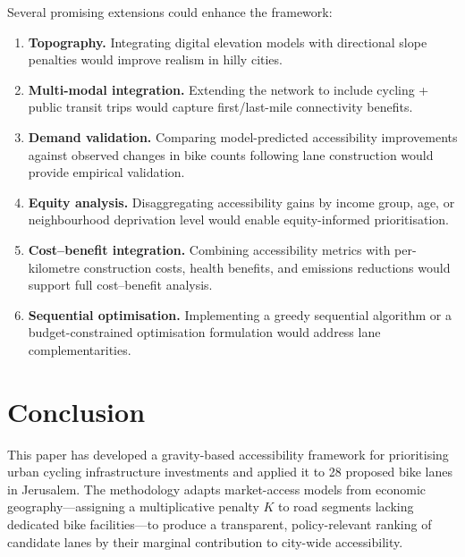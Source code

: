 \documentclass[12pt,a4paper]{article}
\begin{document}
Several promising extensions could enhance the framework:

\begin{enumerate}[leftmargin=*]
    \item \textbf{Topography.} Integrating digital elevation models with directional slope penalties would improve realism in hilly cities.
    \item \textbf{Multi-modal integration.} Extending the network to include cycling + public transit trips would capture first/last-mile connectivity benefits.
    \item \textbf{Demand validation.} Comparing model-predicted accessibility improvements against observed changes in bike counts following lane construction would provide empirical validation.
    \item \textbf{Equity analysis.} Disaggregating accessibility gains by income group, age, or neighbourhood deprivation level would enable equity-informed prioritisation.
    \item \textbf{Cost--benefit integration.} Combining accessibility metrics with per-kilometre construction costs, health benefits, and emissions reductions would support full cost--benefit analysis.
    \item \textbf{Sequential optimisation.} Implementing a greedy sequential algorithm or a budget-constrained optimisation formulation would address lane complementarities.
\end{enumerate}

\section{Conclusion}
\label{sec:conclusion}

This paper has developed a gravity-based accessibility framework for prioritising urban cycling infrastructure investments and applied it to 28 proposed bike lanes in Jerusalem. The methodology adapts market-access models from economic geography---assigning a multiplicative penalty $K$ to road segments lacking dedicated bike facilities---to produce a transparent, policy-relevant ranking of candidate lanes by their marginal contribution to city-wide accessibility.
\end{document}
